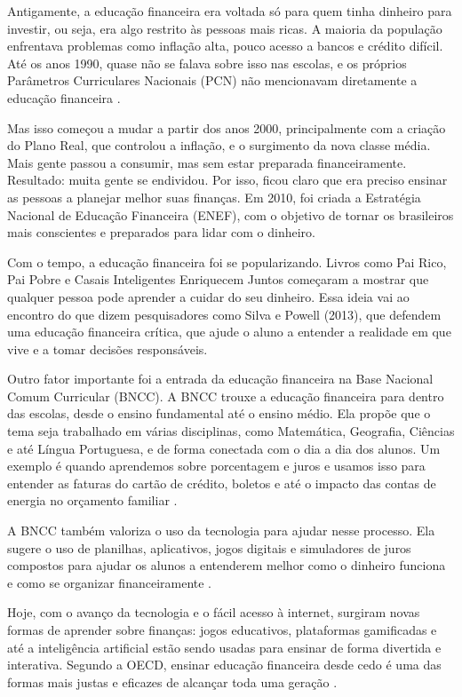 \documentclass[
	article,			%
	12pt,				%
	oneside,			%
	a4paper,			%
	english,			%
	brazil,				%
	sumario=tradicional
	]{abntex2}
\begin{document}
Antigamente, a educação financeira era voltada só para quem tinha dinheiro para investir, ou seja, era algo restrito às pessoas mais ricas. A maioria da população enfrentava problemas como inflação alta, pouco acesso a bancos e crédito difícil. Até os anos 1990, quase não se falava sobre isso nas escolas, e os próprios Parâmetros Curriculares Nacionais (PCN) não mencionavam diretamente a educação financeira  .

Mas isso começou a mudar a partir dos anos 2000, principalmente com a criação do Plano Real, que controlou a inflação, e o surgimento da nova classe média. Mais gente passou a consumir, mas sem estar preparada financeiramente. Resultado: muita gente se endividou. Por isso, ficou claro que era preciso ensinar as pessoas a planejar melhor suas finanças. Em 2010, foi criada a Estratégia Nacional de Educação Financeira (ENEF), com o objetivo de tornar os brasileiros mais conscientes e preparados para lidar com o dinheiro.

Com o tempo, a educação financeira foi se popularizando. Livros como Pai Rico, Pai Pobre e Casais Inteligentes Enriquecem Juntos começaram a mostrar que qualquer pessoa pode aprender a cuidar do seu dinheiro. Essa ideia vai ao encontro do que dizem pesquisadores como Silva e Powell (2013), que defendem uma educação financeira crítica, que ajude o aluno a entender a realidade em que vive e a tomar decisões responsáveis.

Outro fator importante foi a entrada da educação financeira na Base Nacional Comum Curricular (BNCC). A BNCC trouxe a educação financeira para dentro das escolas, desde o ensino fundamental até o ensino médio. Ela propõe que o tema seja trabalhado em várias disciplinas, como Matemática, Geografia, Ciências e até Língua Portuguesa, e de forma conectada com o dia a dia dos alunos. Um exemplo é quando aprendemos sobre porcentagem e juros e usamos isso para entender as faturas do cartão de crédito, boletos e até o impacto das contas de energia no orçamento familiar  .

A BNCC também valoriza o uso da tecnologia para ajudar nesse processo. Ela sugere o uso de planilhas, aplicativos, jogos digitais e simuladores de juros compostos para ajudar os alunos a entenderem melhor como o dinheiro funciona e como se organizar financeiramente  .

Hoje, com o avanço da tecnologia e o fácil acesso à internet, surgiram novas formas de aprender sobre finanças: jogos educativos, plataformas gamificadas e até a inteligência artificial estão sendo usadas para ensinar de forma divertida e interativa. Segundo a OECD, ensinar educação financeira desde cedo é uma das formas mais justas e eficazes de alcançar toda uma geração .
\end{document}
